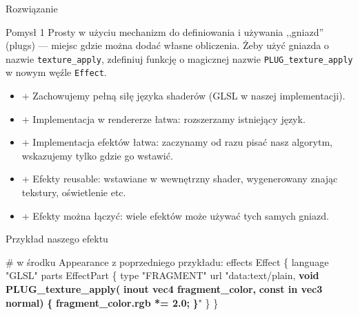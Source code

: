 \documentclass{beamer}
\begin{document}
\begin{frame}{Rozwiązanie}

\begin{block}{Pomysł 1}
Prosty w użyciu mechanizm do definiowania i używania
,,gniazd'' (plugs) --- miejsc gdzie można dodać własne obliczenia.
Żeby użyć gniazda o nazwie \texttt{texture\_apply},
zdefiniuj funkcję o magicznej nazwie \texttt{PLUG\_texture\_apply}
w nowym węźle \texttt{Effect}.
\end{block}

\begin{itemize}
  \item + Zachowujemy pełną siłę języka shaderów (GLSL w naszej implementacji).
  \item + Implementacja w rendererze łatwa: rozszerzamy istniejący język.
  \item + Implementacja efektów łatwa: zaczynamy od razu pisać nasz algorytm,
    wskazujemy tylko gdzie go wstawić.
  \item + Efekty reusable: wstawiane w wewnętrzny shader, wygenerowany
    znając tekstury, oświetlenie etc.
  \item + Efekty można łączyć: wiele efektów może używać tych samych gniazd.
\end{itemize}
\end{frame}

\begin{frame}[fragile]
\begin{exampleblock}{Przykład naszego efektu}
\begin{semiverbatim}
# w środku Appearance z poprzedniego przykładu:
effects Effect \{
  language "GLSL"
  parts EffectPart \{
    type "FRAGMENT"
    url "data:text/plain,
\textbf{    void PLUG\_texture\_apply(}
\textbf{      inout vec4 fragment\_color,}
\textbf{      const in vec3 normal)}
\textbf{    \{}
\textbf{      fragment\_color.rgb *= 2.0;}
\textbf{    \}}"
  \}
\}
\end{semiverbatim}
\end{exampleblock}
\end{frame}

\renewcommand*{\figurename}{Obraz}
\end{document}
